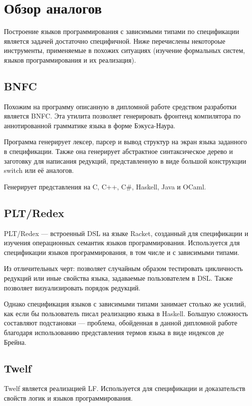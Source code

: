 \section{Обзор аналогов}
Построение языков программирования с зависимыми типами по спецификации является задачей достаточно специфичной. Ниже перечислены некотороые инструменты, применяемые в похожих ситуациях (изучение формальных систем, языков программирования и их реализация).

\subsection{BNFC}
Похожим на программу описанную в дипломной работе средством разработки является BNFC\cite{bnfc}. Эта утилита позволяет генерировать фронтенд компилятора по аннотированной грамматике языка в форме Бэкуса-Наура\cite{lbnf}.

Программа генерирует лексер, парсер и вывод структур на экран языка заданного в спецификации. Также она генерирует абстрактное синтаксическое дерево и заготовку для написания редукций, представленную в виде большой конструкции switch или её аналогов.

Генерирует представления на C, C++, C\#, Haskell, Java и OCaml.

\subsection{PLT/Redex}
PLT/Redex\cite{plt:redex} --- встроенный DSL на языке Racket, созданный для спецификации и изучения операционных семантик языков программирования. Используется для спецификации языков программирования, в том числе и с зависимыми типами.

Из отличительных черт: позволяет случайным образом тестировать цикличность редукций или иные свойства языка, задаваемые пользователем в DSL. Также позволяет визуализировать порядок редукций.

Однако спецификация языков с зависимыми типами занимает столько же усилий, как если бы пользователь писал реализацию языка в Haskell\cite{plt:ex}. Большую сложность составляют подстановки --- проблема, обойденная в данной дипломной работе благодаря использованию представления термов языка в виде индексов де Брейна.

\subsection{Twelf}
Twelf\cite{twelf} является реализацией LF\cite{Pfenning2002}. Используется для спецификации и доказательств свойств логик и языков программирования.

